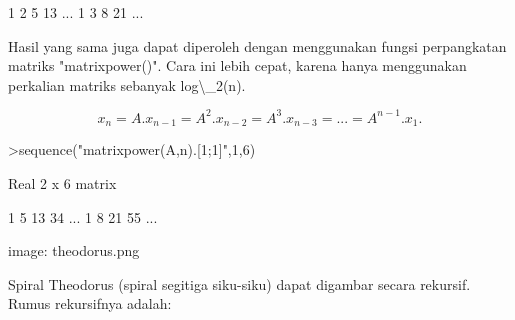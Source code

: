 \documentclass[12pt,Times new roman,letterpaper]{book}
\begin{document}
\begin{eulernootebook}
\begin{eulercomment}
\begin{eulercomment}
\begin{eulernootebook}
\begin{eulercomment}
\begin{eulercomment}
\begin{eulercomment}
\begin{eulercomment}
\begin{eulercomment}
\begin{eulercomment}
\begin{eulernotebook}
\begin{eulercomment}
\begin{eulercomment}
\begin{eulercomment}
\begin{eulercomment}
\begin{eulercomment}
\begin{eulercomment}
\begin{eulercomment}
\begin{eulercomment}
\begin{eulercomment}
\begin{eulercomment}
\begin{eulercomment}
\begin{eulercomment}
\begin{eulercomment}
\begin{eulercomment}
\begin{eulercomment}
\begin{eulercomment}
\begin{eulercomment}
\begin{eulercomment}
\begin{eulercomment}
\begin{eulercomment}
\begin{eulercomment}
\begin{eulercomment}
\begin{eulercomment}
\begin{eulercomment}
\begin{eulercomment}
\begin{eulercomment}
\begin{euleroutput}
              1             2             5            13     ...
              1             3             8            21     ...
\end{euleroutput}
\begin{eulercomment}
Hasil yang sama juga dapat diperoleh dengan menggunakan fungsi
perpangkatan matriks "matrixpower()". Cara ini lebih cepat, karena
hanya menggunakan perkalian matriks sebanyak log\textbackslash{}\_2(n).

\end{eulercomment}
\begin{eulerformula}
\[
x_n=A.x_{n-1}=A^2.x_{n-2}=A^3.x_{n-3}= ... = A^{n-1}.x_1.
\]
\end{eulerformula}
\begin{eulerprompt}
>sequence("matrixpower(A,n).[1;1]",1,6)
\end{eulerprompt}
\begin{euleroutput}
  Real 2 x 6 matrix
  
              1             5            13            34     ...
              1             8            21            55     ...
\end{euleroutput}
\begin{eulercomment}
\begin{eulercomment}
\begin{eulercomment}
image: theodorus.png

Spiral Theodorus (spiral segitiga siku-siku) dapat digambar secara
rekursif. Rumus rekursifnya adalah:


\end{eulercomment}
\end{eulercomment}
\end{eulercomment}
\end{eulercomment}
\end{eulercomment}
\end{eulercomment}
\end{eulercomment}
\end{eulercomment}
\end{eulercomment}
\end{eulercomment}
\end{eulercomment}
\end{eulercomment}
\end{eulercomment}
\end{eulercomment}
\end{eulercomment}
\end{eulercomment}
\end{eulercomment}
\end{eulercomment}
\end{eulercomment}
\end{eulercomment}
\end{eulercomment}
\end{eulercomment}
\end{eulercomment}
\end{eulercomment}
\end{eulercomment}
\end{eulercomment}
\end{eulercomment}
\end{eulercomment}
\end{eulercomment}
\end{eulernotebook}
\end{eulercomment}
\end{eulercomment}
\end{eulercomment}
\end{eulercomment}
\end{eulercomment}
\end{eulercomment}
\end{eulernootebook}
\end{eulercomment}
\end{eulercomment}
\end{eulernootebook}
\end{document}

